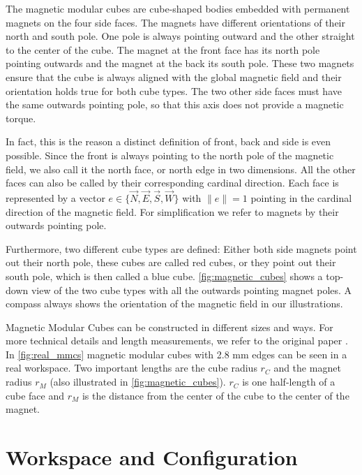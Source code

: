 The magnetic modular cubes are cube-shaped bodies embedded with permanent magnets on the four side faces.
The magnets have different orientations of their north and south pole. 
One pole is always pointing outward and the other straight to the center of the cube.
The magnet at the front face has its north pole pointing outwards and the magnet at the back its south pole.
These two magnets ensure that the cube is always aligned with the global magnetic field and their orientation holds true for both cube types.
The two other side faces must have the same outwards pointing pole, so that this axis does not provide a magnetic torque.

In fact, this is the reason a distinct definition of front, back and side is even possible.
Since the front is always pointing to the north pole of the magnetic field, we also call it the north face, or north edge in two dimensions.
All the other faces can also be called by their corresponding cardinal direction.
Each face is represented by a vector $e \in \{ \vec{N},\vec{E},\vec{S},\vec{W}\}$ with $\lVert e \rVert = 1$ pointing in the cardinal direction of the magnetic field.
For simplification we refer to magnets by their outwards pointing pole.

Furthermore, two different cube types are defined:
Either both side magnets point out their north pole, these cubes are called red cubes, or they point out their south pole, which is then called a blue cube.
\autoref{fig:magnetic_cubes} shows a top-down view of the two cube types with all the outwards pointing magnet poles.
A compass always shows the orientation of the magnetic field in our illustrations.

Magnetic Modular Cubes can be constructed in different sizes and ways. For more technical details and length measurements, we refer to the original paper \cite{Bhattacharjee2022}.
In \autoref{fig:real_mmcs} magnetic modular cubes with 2.8 mm edges can be seen in a real workspace.
Two important lengths are the cube radius $r_C$ and the magnet radius $r_M$ (also illustrated in \autoref{fig:magnetic_cubes}).
$r_C$ is one half-length of a cube face and $r_M$ is the distance from the center of the cube to the center of the magnet.



\section{Workspace and Configuration}
\label{sec:workspace}


